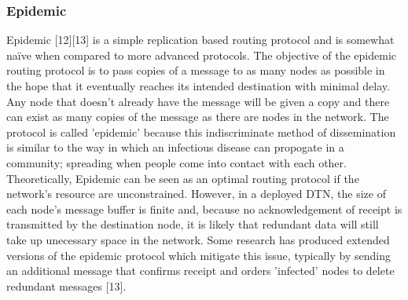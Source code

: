 \documentclass{article}
\begin{document}
\subsubsection{Epidemic}
Epidemic [12][13] is a simple replication based routing protocol and is somewhat naïve when compared to more advanced protocols. The objective of the epidemic routing protocol is to pass copies of a message to as many nodes as possible in the hope that it eventually reaches its intended destination with minimal delay. Any node that doesn't already have the message will be given a copy and there can exist as many copies of the message as there are nodes in the network. The protocol is called 'epidemic' because this indiscriminate method of dissemination is similar to the way in which an infectious disease can propogate in a community; spreading when people come into contact with each other.\\
\newline Theoretically, Epidemic can be seen as an optimal routing protocol if the network's resource are unconstrained. However, in a deployed DTN, the size of each node's message buffer is finite and, because no acknowledgement of receipt is transmitted by the destination node, it is likely that redundant data will still take up unecessary space in the network. Some research has produced extended versions of the epidemic protocol which mitigate this issue, typically by sending an additional message that confirms receipt and orders 'infected' nodes to delete redundant messages [13].
\end{document}
